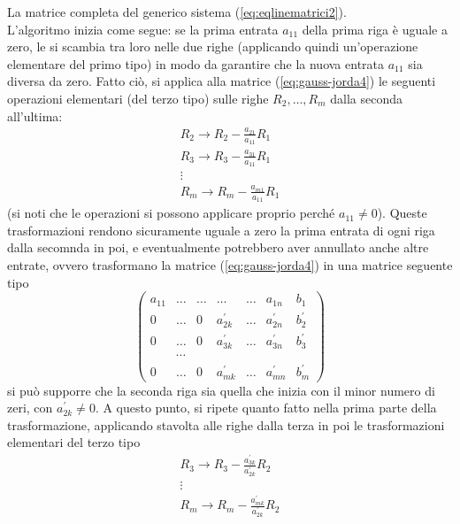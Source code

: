 La matrice completa del generico sistema (\ref{eq:eqlinematrici2}).\\
L'algoritmo inizia come segue: se la prima entrata $a_{11}$ della prima
riga è uguale a zero, le si scambia tra loro nelle due righe (applicando
quindi un'operazione elementare del primo tipo) in modo da garantire che
la nuova entrata $a_{11}$ sia diversa da zero. Fatto ciò, si applica alla
matrice (\ref{eq:gauss-jorda4}) le seguenti operazioni elementari (del
terzo tipo) sulle righe $R_2,\dots,R_m$ dalla seconda all'ultima:
\begin{equation*}
  \begin{matrix}
    R_2\to R_2-\frac{a_{21}}{a_{11}}R_1\\
    R_{3}\to R_3-\frac{a_{31}}{a_{11}}R_1\\
    \vdots\\
    R_{m}\to R_m-\frac{a_{m1}}{a_{11}}R_1
  \end{matrix}
\end{equation*}
(si noti che le operazioni si possono applicare proprio perché
$a_{11}\neq 0$). Queste trasformazioni rendono sicuramente uguale a zero
la prima entrata di ogni riga dalla secomnda in poi, e eventualmente
potrebbero aver annullato anche altre entrate, ovvero trasformano la
matrice (\ref{eq:gauss-jorda4}) in una matrice seguente tipo
\begin{equation}
  \label{eq:gauss-jorda5}
  \begin{pmatrix}
    a_{11} & \dots & \dots & \dots & \dots & a_{1n} & b_1\\
    0 & \dots & 0 & a_{2k}^\prime & \dots & a_{2n}^\prime & b_2^\prime\\
    0 & \dots & 0 & a_{3k}^\prime & \dots & a_{3n}^\prime & b_3^\prime\\
           & \cdots\\
    0 & \dots & 0 & a_{mk}^\prime & \dots & a_{mn}^\prime & b_m^\prime
  \end{pmatrix}
\end{equation}
si può supporre che la seconda riga sia quella che inizia con il minor
numero di zeri, con $a_{2k}^\prime\neq 0$. A questo punto, si ripete quanto
fatto nella prima parte della trasformazione, applicando stavolta alle
righe dalla terza in poi le trasformazioni elementari del terzo tipo
\begin{equation*}
  \begin{matrix}
    R_3\to R_3-\frac{a^\prime_{3k}}{a_{2k}^\prime}R_2\\
    \vdots\\
    R_m\to R_m-\frac{a^\prime_{mk}}{a_{2k}^\prime}R_2\\
  \end{matrix}
\end{equation*}
